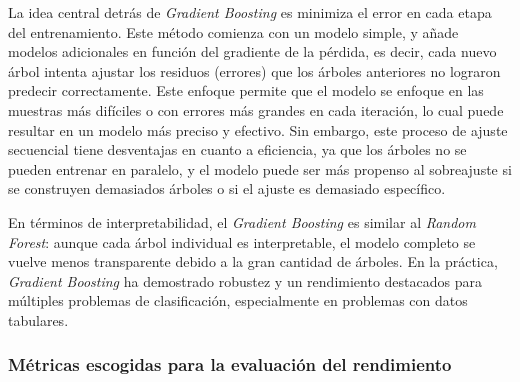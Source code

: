 \begin{enumerate}
    La idea central detrás de \textit{Gradient Boosting} es minimiza el error en cada etapa del entrenamiento. Este método comienza con un modelo simple, y añade modelos adicionales en función del gradiente de la pérdida, es decir, cada nuevo árbol intenta ajustar los residuos (errores) que los árboles anteriores no lograron predecir correctamente. Este enfoque permite que el modelo se enfoque en las muestras más difíciles o con errores más grandes en cada iteración, lo cual puede resultar en un modelo más preciso y efectivo. Sin embargo, este proceso de ajuste secuencial tiene desventajas en cuanto a eficiencia, ya que los árboles no se pueden entrenar en paralelo, y el modelo puede ser más propenso al sobreajuste si se construyen demasiados árboles o si el ajuste es demasiado específico.

    En términos de interpretabilidad, el \textit{Gradient Boosting} es similar al \textit{Random Forest}: aunque cada árbol individual es interpretable, el modelo completo se vuelve menos transparente debido a la gran cantidad de árboles. En la práctica, \textit{Gradient Boosting} ha demostrado robustez y un rendimiento destacados para múltiples problemas de clasificación, especialmente en problemas con datos tabulares.

\end{enumerate}


\subsubsection{Métricas escogidas para la evaluación del rendimiento}

